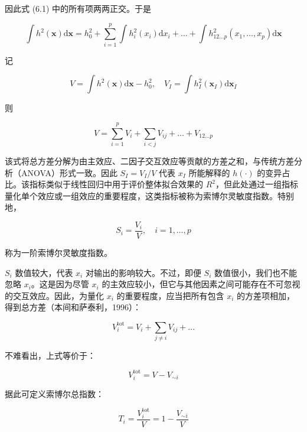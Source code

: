 \documentclass{ctexart}
\begin{document}
因此式 (6.1) 中的所有项两两正交。于是

\begin{equation*}
\int h^2(\boldsymbol{x})\mathrm{d}\boldsymbol{x}=h_0^2+\sum_{i=1}^{p}\int h_i^2(x_i)\mathrm{d}x_i+\dots+\int h_{12\dots p}^2(x_1,\dots,x_p)\mathrm{d}\boldsymbol{x}
\end{equation*}

记

\begin{equation*}
V=\int h^2(\boldsymbol{x})\mathrm{d}\boldsymbol{x}-h_0^2,\quad V_I=\int h_I^2(\boldsymbol{x}_I)\mathrm{d}\boldsymbol{x}_I
\end{equation*}

则

\begin{equation*}
V=\sum_{i=1}^{p}V_i+\sum_{i<j}V_{ij}+\dots+V_{12\dots p}
\end{equation*}

该式将总方差分解为由主效应、二因子交互效应等贡献的方差之和，与传统方差分析（ANOVA）形式一致。因此 $S_I=V_I/V$ 代表 $x_I$ 所能解释的 $h(\cdot)$ 的变异占比。该指标类似于线性回归中用于评价整体拟合效果的 $R^2$，但此处通过一组指标量化单个效应或一组效应的重要程度，这类指标被称为索博尔灵敏度指数。特别地，

\begin{equation*}
S_i=\frac{V_i}{V},\quad i=1,\dots,p
\tag{6.3}
\end{equation*}

称为一阶索博尔灵敏度指数。

$S_i$ 数值较大，代表 $x_i$ 对输出的影响较大。不过，即便 $S_i$ 数值很小，我们也不能忽略 $x_i$。这是因为尽管 $x_i$ 的主效应较小，但它与其他因素之间可能存在不可忽视的交互效应。因此，为量化 $x_i$ 的重要程度，应当把所有包含 $x_i$ 的方差项相加，得到总方差（本间和萨泰利，1996）：

\begin{equation*}
V_i^{\text{tot}}=V_i+\sum_{j\neq i}V_{ij}+\dots
\end{equation*}

不难看出，上式等价于：

\begin{equation*}
V_i^{\text{tot}}=V-V_{\sim i}
\end{equation*}

据此可定义索博尔总指数：

\begin{equation*}
T_i=\frac{V_i^{\text{tot}}}{V}=1-\frac{V_{\sim i}}{V}
\tag{6.4}
\end{equation*}
\end{document}
